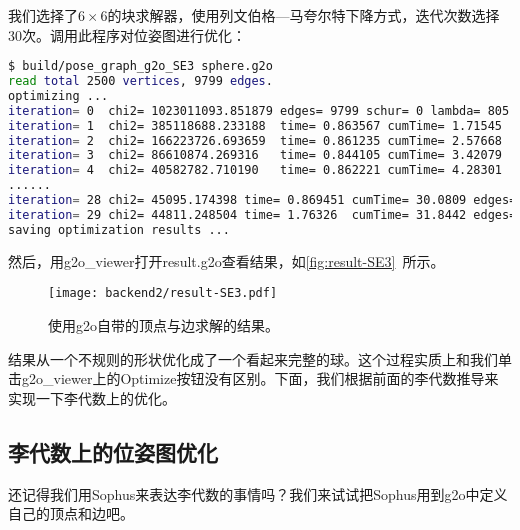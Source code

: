 我们选择了$6\times6$的块求解器，使用列文伯格—马夸尔特下降方式，迭代次数选择30次。调用此程序对位姿图进行优化：
\begin{lstlisting}[language=sh, caption=终端输入：]
$ build/pose_graph_g2o_SE3 sphere.g2o 
read total 2500 vertices, 9799 edges.
optimizing ...
iteration= 0  chi2= 1023011093.851879 edges= 9799 schur= 0 lambda= 805.622433 levenbergIter= 1
iteration= 1  chi2= 385118688.233188  time= 0.863567 cumTime= 1.71545  edges= 9799 schur= 0 lambda= 537.081622 levenbergIter= 1
iteration= 2  chi2= 166223726.693659  time= 0.861235 cumTime= 2.57668  edges= 9799 schur= 0 lambda= 358.054415 levenbergIter= 1
iteration= 3  chi2= 86610874.269316   time= 0.844105 cumTime= 3.42079  edges= 9799 schur= 0 lambda= 238.702943 levenbergIter= 1
iteration= 4  chi2= 40582782.710190   time= 0.862221 cumTime= 4.28301  edges= 9799 schur= 0 lambda= 159.135295 levenbergIter= 1
......
iteration= 28 chi2= 45095.174398 time= 0.869451 cumTime= 30.0809 edges= 9799 schur= 0 lambda= 0.003127 levenbergIter= 1
iteration= 29 chi2= 44811.248504 time= 1.76326  cumTime= 31.8442 edges= 9799 schur= 0 lambda= 0.003785 levenbergIter= 2
saving optimization results ...
\end{lstlisting}

然后，用g2o\_viewer打开result.g2o查看结果，如\autoref{fig:result-SE3}~所示。
\begin{figure}[!ht]
	\centering
	\texttt{[image: backend2/result-SE3.pdf]}
	\caption{使用g2o自带的顶点与边求解的结果。}
	\label{fig:result-SE3}
\end{figure}

结果从一个不规则的形状优化成了一个看起来完整的球。这个过程实质上和我们单击g2o\_viewer上的Optimize按钮没有区别。下面，我们根据前面的李代数推导来实现一下李代数上的优化。

\subsection{李代数上的位姿图优化}
还记得我们用Sophus来表达李代数的事情吗？我们来试试把Sophus用到g2o中定义自己的顶点和边吧。

